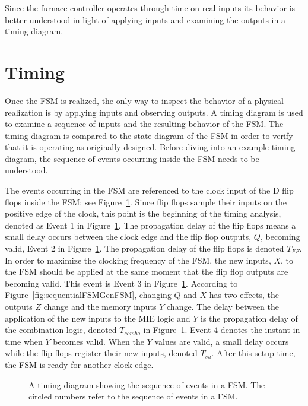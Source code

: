 Since the furnace controller operates through time on real
inputs its behavior is better understood in light of applying 
inputs and examining the outputs in a timing diagram.



\section{Timing}
Once the FSM is realized, the only way to inspect the behavior of a physical
realization is by applying inputs and observing outputs.  A timing 
diagram is used to examine a sequence of inputs and the resulting behavior of the FSM.
The timing diagram is compared to the state diagram of the FSM in order 
to verify that it is operating as originally designed.  Before diving into an 
example timing diagram,  the sequence of events
occurring  inside the FSM needs to be understood.

The events occurring in the FSM are referenced to the clock input of the 
D flip flops inside the FSM; see Figure~\ref{fig:sequentialFSMGenTime}.  Since flip
flops sample their inputs on the positive edge of the clock, this point is the
beginning of the timing analysis, denoted as Event 1 in 
Figure~\ref{fig:sequentialFSMGenTime}.  The propagation delay of the flip flops means 
a small delay occurs between the clock edge and the flip flop outputs, $Q$,
becoming valid, Event 2 in Figure~\ref{fig:sequentialFSMGenTime}.  The propagation delay 
of the flip flops is denoted $T_{FF}$.  In order to maximize the clocking 
frequency of the FSM, the new inputs, $X$, to the FSM should be applied at the
same moment that the flip flop outputs are becoming valid.  This event is Event 3
in Figure~\ref{fig:sequentialFSMGenTime}. According to Figure~\ref{fig:sequentialFSMGenFSM}, changing
$Q$ and $X$ has two effects, the outputs $Z$ change and the memory
inputs $Y$ change.  The delay between the application of the new inputs to
the MIE logic and $Y$ is the propagation delay of the combination logic, denoted
$T_{combo}$ in Figure~\ref{fig:sequentialFSMGenTime}.  Event 4 denotes the instant in time
when $Y$ becomes valid.  When the $Y$ values are valid, a small
delay occurs while the flip flops register their new inputs, denoted $T_{su}$.  After 
this setup time, the FSM is ready for another clock edge.  

\begin{figure}[ht]

\caption{A timing diagram showing the sequence of events in a FSM.
The circled numbers refer to the sequence of events in a FSM.}
\label{fig:sequentialFSMGenTime}

\end{figure}
\label{page:GenTime}


